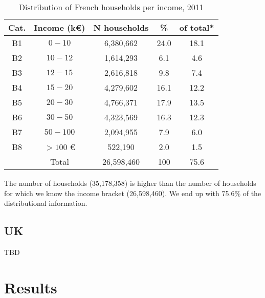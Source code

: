 \documentclass[11.5pt]{article}
\begin{document}
\begin{table}[h!]
\begin{center}
\caption{Distribution of French households per income, 2011}
\label{tab:incomeFr}
\begin{tabular}{|c|c|c|c|c|}
\hline
Cat. & Income (k\euro) & N households & \% & of total* \\ \hline
B1 & $0 - 10$   & 6,380,662 & 24.0 & 18.1 \\
B2 & $10 - 12$   & 1,614,293 & 6.1 & 4.6  \\
B3 & $12 - 15$   & 2,616,818 & 9.8 & 7.4 \\
B4 & $15- 20$   & 4,279,602 & 16.1 & 12.2 \\
B5 & $20 - 30$   & 4,766,371 & 17.9 & 13.5 \\
B6 & $30 - 50$   & 4,323,569 & 16.3 & 12.3 \\
B7 & $50 - 100$   & 2,094,955 & 7.9 & 6.0 \\
B8 & $> 100$  \euro & 522,190 & 2.0 & 1.5\\ \hline
 & Total & 26,598,460 & 100 & 75.6  \\ \hline
\end{tabular}
\end{center}
\small *The number of households (35,178,358) is higher than the number of households for which we know the income bracket (26,598,460). We end up with 75.6\% of the distributional information.
\end{table}


\subsection{UK}

TBD
\section{Results}







\end{document}
